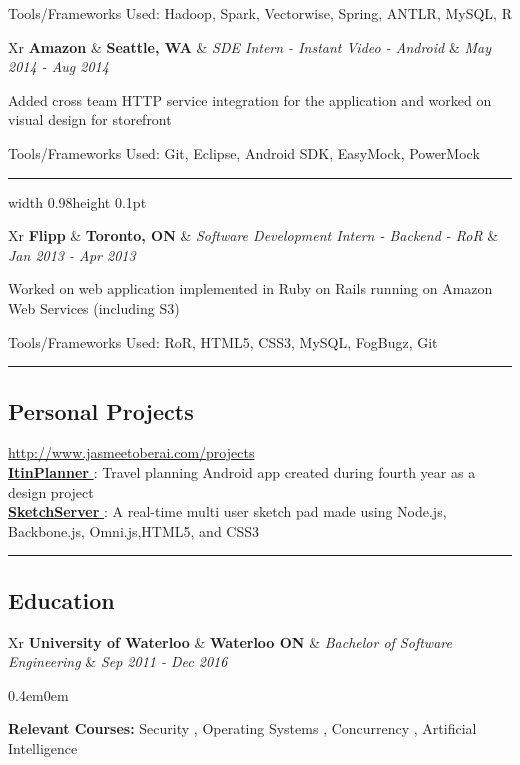\documentclass[11pt,letterpaper]{article}
\newcommand{\subsectioncustomend}[1]
{
\vspace{-0.8em}
\subsection*{#1}
}
\newcommand{\subsectioncustom}[1]
{
\hrule
\subsectioncustomend{#1}
}
\newcommand{\worksectionend}[5]
{
\begin{tabularx}{\textwidth}{Xr}
\textbf{#1}
&
\textbf{#2}
&
\emph{#3}
&
\emph{#4}
\end{tabularx}
\vspace{-1.2em}
{#5}
}
\newcommand{\worksection}[5]
{
\worksectionend{#1}{#2}{#3}{#4}{#5}
\vspace{-1.2em}
\textcolor{greyish}{\hrule width 0.98\textwidth height 0.1pt}
}
\newcommand{\schoolsectionend}[5]{
\worksectionend{#1}{#2}{#3}{#4}
{
\vspace{0.5em}

\begin{adjustwidth}{0.4em}{0em}

#5

\end{adjustwidth}
}

}
\begin{document}
\begin{flushleft}
{{\begin{itemize*}
{                \item { Tools/Frameworks Used: Hadoop, Spark, Vectorwise, Spring, ANTLR, MySQL, R }
        }
        \end{itemize*}
    }
}
{
\worksection
    {
        Amazon
    }
    {
        Seattle, WA
    }
    {
        SDE Intern - Instant Video - Android
    }
    {
        May 2014
        - Aug 2014
    }
    {
        \begin{itemize*}
        {
                \item { Added cross team HTTP service integration for the application and worked on visual design for storefront }
                \item { Tools/Frameworks Used: Git, Eclipse, Android SDK, EasyMock, PowerMock }
        }
        \end{itemize*}
    }
}
{
\worksectionend
    {
        Flipp
    }
    {
        Toronto, ON
    }
    {
        Software Development Intern - Backend - RoR
    }
    {
        Jan 2013
        - Apr 2013
    }
    {
        \begin{itemize*}
        {
                \item { Worked on web application implemented in Ruby on Rails running on Amazon Web Services (including S3) }
                \item { Tools/Frameworks Used: RoR, HTML5, CSS3, MySQL, FogBugz, Git }
        }
        \end{itemize*}
    }
}

\end{flushleft}


\subsectioncustom{Personal Projects}
\vspace{-0.5em}
\begin{flushleft}
    {
        \textcolor{greyish}{ \href{ http://www.jasmeetoberai.com/projects }{ http://www.jasmeetoberai.com/projects }}
    }
        \\
        {
        \href{ https://play.google.com/store/apps/details?id=com.jbap.itinplanner }{\textbf{ ItinPlanner }}: Travel planning Android app created during fourth year as a design project
        }
        \\
        {
        \href{ http://git.io/tuKCsQ }{\textbf{ SketchServer }}: A real-time multi user sketch pad made using Node.js, Backbone.js, Omni.js,HTML5, and CSS3
        }
\end{flushleft}




\subsectioncustom{Education}
\begin{flushleft}
    \schoolsectionend
    {
      University of Waterloo
    }
    {
    Waterloo ON
    }
    {
    Bachelor of Software Engineering
    }
    {
        Sep 2011
        - Dec 2016
    }
    {
        \textbf{Relevant Courses:}
             Security
            ,  Operating Systems
            ,  Concurrency
            ,  Artificial Intelligence
    }
\end{flushleft}
\end{document}
